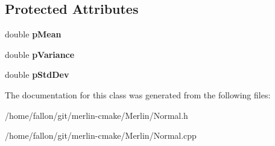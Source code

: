 \subsection*{Protected Attributes}
\begin{DoxyCompactItemize}
\item 
\mbox{\label{classNormal_a0b3f96d6bc1fcb410ec0459163c93592}} 
double {\bfseries p\+Mean}
\item 
\mbox{\label{classNormal_a05378bf23b8f202492e4681eb233d2d9}} 
double {\bfseries p\+Variance}
\item 
\mbox{\label{classNormal_a7a9ef250fa4bbf940566a61fee8904eb}} 
double {\bfseries p\+Std\+Dev}
\end{DoxyCompactItemize}


The documentation for this class was generated from the following files\+:\begin{DoxyCompactItemize}
\item 
/home/fallon/git/merlin-\/cmake/\+Merlin/Normal.\+h\item 
/home/fallon/git/merlin-\/cmake/\+Merlin/Normal.\+cpp\end{DoxyCompactItemize}
